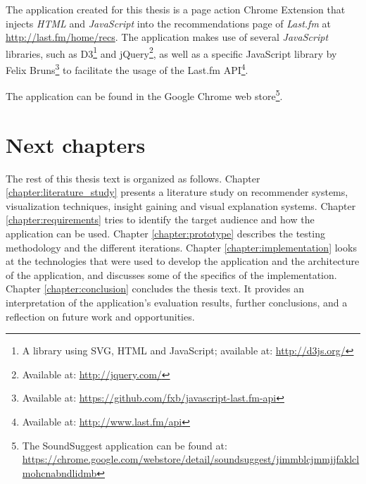The application created for this thesis is a page action Chrome Extension that injects \emph{HTML} and \emph{JavaScript} into the recommendations page of \emph{Last.fm} at \url{http://last.fm/home/recs}. The application makes use of several \emph{JavaScript} libraries, such as D3\footnote{A library using SVG, HTML and JavaScript\cite{bostock:2012:d3js}; available at: \url{http://d3js.org/}} and jQuery\footnote{Available at: \url{http://jquery.com/}}, as well as a specific JavaScript library by Felix Bruns\footnote{Available at: \url{https://github.com/fxb/javascript-last.fm-api}} to facilitate the usage of the Last.fm API\footnote{Available at: \url{http://www.last.fm/api}}.

The application can be found in the Google Chrome web store\footnote{The SoundSuggest application can be found at: \url{https://chrome.google.com/webstore/detail/soundsuggest/jimmblcjmmjjfaklclmohcnabndlidmb}}.


\section{Next chapters}\label{chapter:introduction:section:chapters}

The rest of this thesis text is organized as follows. Chapter \ref{chapter:literature_study} presents a literature study on recommender systems, visualization techniques, insight gaining and visual explanation systems. Chapter \ref{chapter:requirements} tries to identify the target audience and how the application can be used. Chapter \ref{chapter:prototype} describes the testing methodology and the different iterations. Chapter \ref{chapter:implementation} looks at the technologies that were used to develop the application and the architecture of the application, and discusses some of the specifics of the implementation. Chapter \ref{chapter:conclusion} concludes the thesis text. It provides an interpretation of the application's evaluation results, further conclusions, and a reflection on future work and opportunities.
